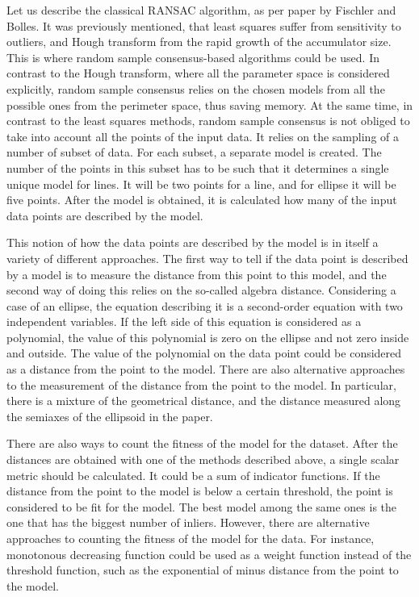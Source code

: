 Let us describe the classical RANSAC algorithm, as per paper by Fischler and Bolles. It was previously mentioned, that least squares suffer from sensitivity to outliers, and Hough transform from the rapid growth of the accumulator size. This is where random sample consensus-based algorithms could be used. In contrast to the Hough transform, where all the parameter space is considered explicitly, random sample consensus relies on the chosen models from all the possible ones from the perimeter space, thus saving memory. At the same time, in contrast to the least squares methods, random sample consensus is not obliged to take into account all the points of the input data. It relies on the sampling of a number of subset of data. For each subset, a separate model is created. The number of the points in this subset has to be such that it determines a single unique model for lines. It will be two points for a line, and for ellipse it will be five points. After the model is obtained, it is calculated how many of the input data points are described by the model.

This notion of how the data points are described by the model is in itself a variety of different approaches. The first way to tell if the data point is described by a model is to measure the distance from this point to this model, and the second way of doing this relies on the so-called algebra distance. Considering a case of an ellipse, the equation describing it is a second-order equation with two independent variables. If the left side of this equation is considered as a polynomial, the value of this polynomial is zero on the ellipse and not zero inside and outside. The value of the polynomial on the data point could be considered as a distance from the point to the model. There are also alternative approaches to the measurement of the distance from the point to the model. In particular, there is a mixture of the geometrical distance, and the distance measured along the semiaxes of the ellipsoid in the paper.

There are also ways to count the fitness of the model for the dataset. After the distances are obtained with one of the methods described above, a single scalar metric should be calculated. It could be a sum of indicator functions. If the distance from the point to the model is below a certain threshold, the point is considered to be fit for the model. The best model among the same ones is the one that has the biggest number of inliers. However, there are alternative approaches to counting the fitness of the model for the data. For instance, monotonous decreasing function could be used as a weight function instead of the threshold function, such as the exponential of minus distance from the point to the model.


